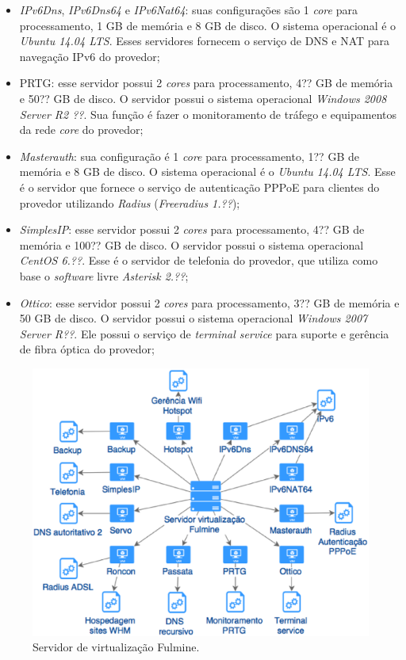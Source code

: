 \begin{itemize}
 \item \textit{IPv6Dns}, \textit{IPv6Dns64} e \textit{IPv6Nat64}: suas configurações são 1 \textit{core} para processamento, 1 GB de memória e 
 8 GB de disco. O sistema operacional é o \textit{Ubuntu 14.04 \ac{LTS}}. Esses servidores fornecem o serviço de \ac{DNS} e \ac{NAT} para 
 navegação \ac{IPv6} do provedor;
 
 \item \ac{PRTG}: esse servidor possui 2 \textit{cores} para processamento, 4?? GB de memória e 50?? GB de disco. O servidor possui o sistema 
 operacional \textit{Windows 2008 Server R2 ??}. Sua função é fazer o monitoramento de tráfego e equipamentos da rede \textit{core} do provedor;
 
 \item \textit{Masterauth}: sua configuração é 1 \textit{core} para processamento, 1?? GB de memória e 8 GB de disco. O sistema operacional é o 
 \textit{Ubuntu 14.04 \ac{LTS}}. Esse é o servidor que fornece o serviço de autenticação \ac{PPPoE} para clientes do provedor utilizando 
 \textit{Radius} (\textit{Freeradius 1.??});
 
 \item \textit{SimplesIP}: esse servidor possui 2 \textit{cores} para processamento, 4?? GB de memória e 100?? GB de disco. O servidor possui 
 o sistema operacional \textit{CentOS 6.??}. Esse é o servidor de telefonia do provedor, que utiliza como base o \textit{software} livre 
 \textit{Asterisk 2.??};
 
 \item \textit{Ottico}: esse servidor possui 2 \textit{cores} para processamento, 3?? GB de memória e 50 GB de disco. O servidor possui o sistema 
 operacional \textit{Windows 2007 Server R??}. Ele possui o serviço de \textit{terminal service} para suporte e gerência de fibra óptica do 
 provedor;
\end{itemize}

\begin{figure}[h!]
 \centering
 \includegraphics[width=430px]{img/serv_fulmine.eps}
 \caption{Servidor de virtualização Fulmine.}
 \label{fig:serv_fulmine}
\end{figure}

